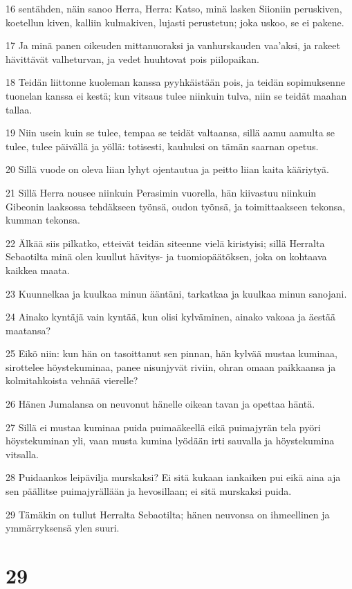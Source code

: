 \par 16 sentähden, näin sanoo Herra, Herra: Katso, minä lasken Siioniin peruskiven, koetellun kiven, kalliin kulmakiven, lujasti perustetun; joka uskoo, se ei pakene.
\par 17 Ja minä panen oikeuden mittanuoraksi ja vanhurskauden vaa'aksi, ja rakeet hävittävät valheturvan, ja vedet huuhtovat pois piilopaikan.
\par 18 Teidän liittonne kuoleman kanssa pyyhkäistään pois, ja teidän sopimuksenne tuonelan kanssa ei kestä; kun vitsaus tulee niinkuin tulva, niin se teidät maahan tallaa.
\par 19 Niin usein kuin se tulee, tempaa se teidät valtaansa, sillä aamu aamulta se tulee, tulee päivällä ja yöllä: totisesti, kauhuksi on tämän saarnan opetus.
\par 20 Sillä vuode on oleva liian lyhyt ojentautua ja peitto liian kaita kääriytyä.
\par 21 Sillä Herra nousee niinkuin Perasimin vuorella, hän kiivastuu niinkuin Gibeonin laaksossa tehdäkseen työnsä, oudon työnsä, ja toimittaakseen tekonsa, kumman tekonsa.
\par 22 Älkää siis pilkatko, etteivät teidän siteenne vielä kiristyisi; sillä Herralta Sebaotilta minä olen kuullut hävitys- ja tuomiopäätöksen, joka on kohtaava kaikkea maata.
\par 23 Kuunnelkaa ja kuulkaa minun ääntäni, tarkatkaa ja kuulkaa minun sanojani.
\par 24 Ainako kyntäjä vain kyntää, kun olisi kylväminen, ainako vakoaa ja äestää maatansa?
\par 25 Eikö niin: kun hän on tasoittanut sen pinnan, hän kylvää mustaa kuminaa, sirottelee höystekuminaa, panee nisunjyvät riviin, ohran omaan paikkaansa ja kolmitahkoista vehnää vierelle?
\par 26 Hänen Jumalansa on neuvonut hänelle oikean tavan ja opettaa häntä.
\par 27 Sillä ei mustaa kuminaa puida puimaäkeellä eikä puimajyrän tela pyöri höystekuminan yli, vaan musta kumina lyödään irti sauvalla ja höystekumina vitsalla.
\par 28 Puidaankos leipävilja murskaksi? Ei sitä kukaan iankaiken pui eikä aina aja sen päällitse puimajyrällään ja hevosillaan; ei sitä murskaksi puida.
\par 29 Tämäkin on tullut Herralta Sebaotilta; hänen neuvonsa on ihmeellinen ja ymmärryksensä ylen suuri.

\chapter{29}

